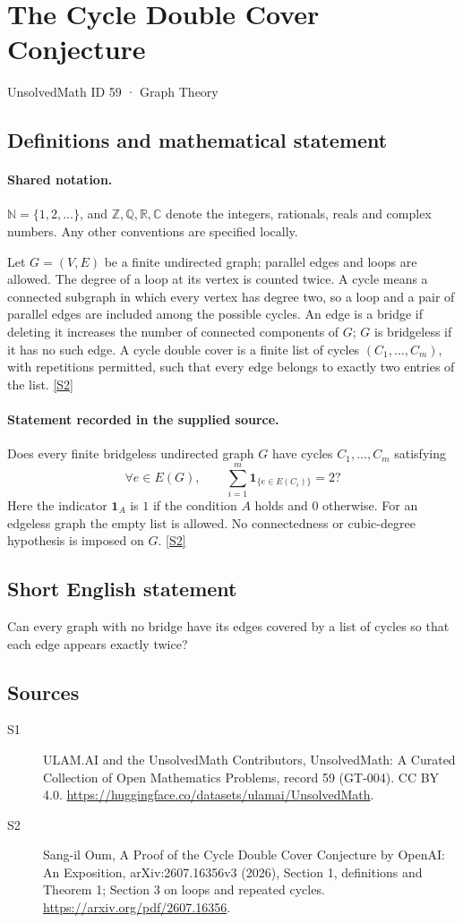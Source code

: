 \documentclass[11pt]{article}
\newcommand{\sref}[2]{\hyperlink{source:#1:#2}{[S#2]}}
\begin{document}
\setcounter{section}{58}
\section{The Cycle Double Cover Conjecture}\label{59}
{\small\sffamily UnsolvedMath ID 59 · Graph Theory}
\subsection{Definitions and mathematical statement}

\paragraph{Shared notation.}$\mathbb N=\{1,2,\ldots\}$, and $\mathbb Z,\mathbb Q,\mathbb R,\mathbb C$ denote the integers, rationals, reals and complex numbers. Any other conventions are specified locally.


Let $G=(V,E)$ be a finite undirected graph; parallel edges and loops are allowed. The degree of a loop at its vertex is counted twice. A cycle means a connected subgraph in which every vertex has degree two, so a loop and a pair of parallel edges are included among the possible cycles. An edge is a bridge if deleting it increases the number of connected components of $G$; $G$ is bridgeless if it has no such edge. A cycle double cover is a finite list of cycles $(C_1,\ldots,C_m)$, with repetitions permitted, such that every edge belongs to exactly two entries of the list. \sref{59}{2}
\paragraph{Statement recorded in the supplied source.}
Does every finite bridgeless undirected graph $G$ have cycles $C_1,\ldots,C_m$ satisfying
\[
 \forall e\in E(G),\qquad
 \sum_{i=1}^m\mathbf 1_{\{e\in E(C_i)\}}=2?
\]
Here the indicator $\mathbf 1_A$ is $1$ if the condition $A$ holds and $0$ otherwise. For an edgeless graph the empty list is allowed. No connectedness or cubic-degree hypothesis is imposed on $G$. \sref{59}{2}
\subsection{Short English statement}
Can every graph with no bridge have its edges covered by a list of cycles so that each edge appears exactly twice?
\subsection{Sources}
\begin{description}
\item[\hypertarget{source:59:1}{S1}] ULAM.AI and the UnsolvedMath Contributors, UnsolvedMath: A Curated Collection of Open Mathematics Problems, record 59 (GT-004). CC BY 4.0. \url{https://huggingface.co/datasets/ulamai/UnsolvedMath}.
\item[\hypertarget{source:59:2}{S2}] Sang-il Oum, A Proof of the Cycle Double Cover Conjecture by OpenAI: An Exposition, arXiv:2607.16356v3 (2026), Section 1, definitions and Theorem 1; Section 3 on loops and repeated cycles. \url{https://arxiv.org/pdf/2607.16356}.
\end{description}
\label{end:59}
\end{document}

